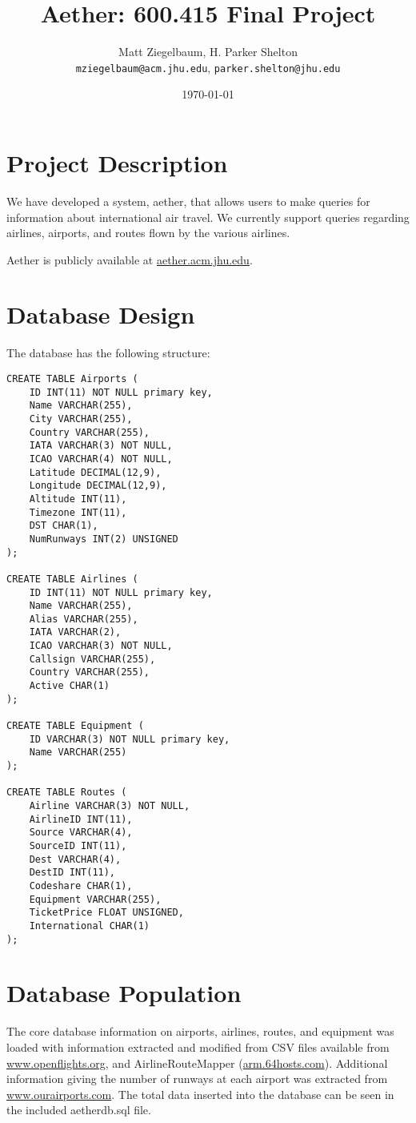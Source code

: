 \documentclass[12pt, letterpaper]{article}
\title{Aether: 600.415 Final Project}
\author{Matt Ziegelbaum, H. Parker Shelton\\\texttt{mziegelbaum@acm.jhu.edu}, \texttt{parker.shelton@jhu.edu}}
\date{\today}
\begin{document}
\maketitle

\tableofcontents

\section{Project Description}
	We have developed a system, aether, that allows users to make queries for information about international air travel. We currently support queries regarding airlines, airports, and routes flown by the various airlines.
		
\indent Aether is publicly available at \url{aether.acm.jhu.edu}.

\section{Database Design}
	The database has the following structure:
    
\begin{verbatim}
CREATE TABLE Airports (
    ID INT(11) NOT NULL primary key,
    Name VARCHAR(255),
    City VARCHAR(255),
    Country VARCHAR(255),
    IATA VARCHAR(3) NOT NULL,
    ICAO VARCHAR(4) NOT NULL,
    Latitude DECIMAL(12,9),
    Longitude DECIMAL(12,9),
    Altitude INT(11),
    Timezone INT(11),
    DST CHAR(1),
    NumRunways INT(2) UNSIGNED
);
    
CREATE TABLE Airlines (
    ID INT(11) NOT NULL primary key,
    Name VARCHAR(255),
    Alias VARCHAR(255),
    IATA VARCHAR(2),
    ICAO VARCHAR(3) NOT NULL,
    Callsign VARCHAR(255),
    Country VARCHAR(255),
    Active CHAR(1)
);

CREATE TABLE Equipment ( 
    ID VARCHAR(3) NOT NULL primary key,
    Name VARCHAR(255)
);
    
CREATE TABLE Routes (
    Airline VARCHAR(3) NOT NULL,
    AirlineID INT(11),
    Source VARCHAR(4),
    SourceID INT(11),
    Dest VARCHAR(4),
    DestID INT(11),
    Codeshare CHAR(1),
    Equipment VARCHAR(255),
    TicketPrice FLOAT UNSIGNED,
    International CHAR(1)
);
\end{verbatim}

\section{Database Population}
	The core database information on airports, airlines, routes, and equipment was loaded with information extracted and modified from CSV files available from \url{www.openflights.org}, and AirlineRouteMapper (\url{arm.64hosts.com}). Additional information giving the number of runways at each airport was extracted from \mbox{\url{www.ourairports.com}}. The total data inserted into the database can be seen in the included aetherdb.sql file.
\end{document}
